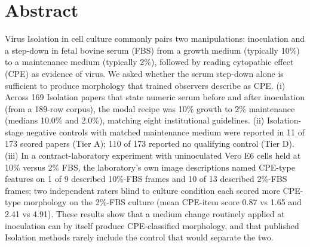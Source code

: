 \section*{Abstract}
Virus Isolation in cell culture commonly pairs two manipulations: inoculation and a step-down in fetal bovine serum (FBS) from a growth medium (typically 10\%) to a maintenance medium (typically 2\%), followed by reading cytopathic effect (CPE) as evidence of virus. We asked whether the serum step-down alone is sufficient to produce morphology that trained observers describe as CPE. (i) Across 169 Isolation papers that state numeric serum before and after inoculation (from a 189-row corpus), the modal recipe was 10\% growth to 2\% maintenance (medians 10.0\% and 2.0\%), matching eight institutional guidelines. (ii) Isolation-stage negative controls with matched maintenance medium were reported in 11 of 173 scored papers (Tier A); 110 of 173 reported no qualifying control (Tier D). (iii) In a contract-laboratory experiment with uninoculated Vero E6 cells held at 10\% versus 2\% FBS, the laboratory's own image descriptions named CPE-type features on 1 of 9 described 10\%-FBS frames and 10 of 13 described 2\%-FBS frames; two independent raters blind to culture condition each scored more CPE-type morphology on the 2\%-FBS culture (mean CPE-item score 0.87 vs 1.65 and 2.41 vs 4.91).  These results show that a medium change routinely applied at inoculation can by itself produce CPE-classified morphology, and that published Isolation methods rarely include the control that would separate the two. 
